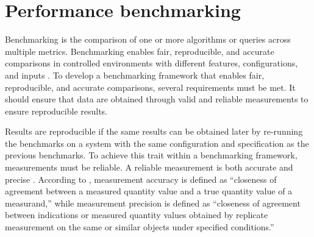\section{Performance benchmarking}
Benchmarking is the comparison of one or more algorithms or queries across multiple metrics. Benchmarking enables fair, reproducible, and accurate comparisons in controlled environments with different features, configurations, and inputs \parencite{beyer_2015_benchmarking_and_resource_measurement, halkos2018_corporate_social_responsibility}. To develop a benchmarking framework that enables fair, reproducible, and accurate comparisons, several requirements must be met. It should ensure that data are obtained through valid and reliable measurements to ensure reproducible results. 

Results are reproducible if the same results can be obtained later by re-running the benchmarks on a system with the same configuration and specification as the previous benchmarks. To achieve this trait within a benchmarking framework, measurements must be reliable. A reliable measurement is both accurate and precise \parencite{beyer_2015_benchmarking_and_resource_measurement}. According to \textcite[pp.~21--22]{jcgm2012_international_vocabulary_of_metrology}, measurement accuracy is defined as ``closeness of agreement between a measured quantity value and a true quantity value of a measurand,''  while measurement precision is defined as ``closeness of agreement between indications or measured quantity values obtained by replicate measurement on the same or similar objects under specified conditions.'' 



